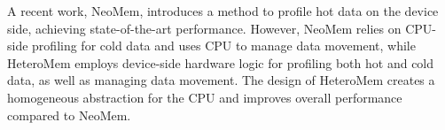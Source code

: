 A recent work, NeoMem, introduces a method to profile hot data on the device side, achieving state-of-the-art performance. However, NeoMem relies on CPU-side profiling for cold data and uses CPU to manage data movement, while HeteroMem employs device-side hardware logic for profiling both hot and cold data, as well as managing data movement. The design of HeteroMem creates a homogeneous abstraction for the CPU and improves overall performance compared to NeoMem.
